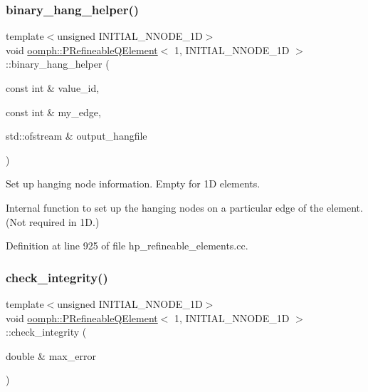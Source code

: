 \subsubsection{\texorpdfstring{binary\+\_\+hang\+\_\+helper()}{binary\_hang\_helper()}}
{\footnotesize\ttfamily template$<$unsigned I\+N\+I\+T\+I\+A\+L\+\_\+\+N\+N\+O\+D\+E\+\_\+1D$>$ \\
void \hyperlink{classoomph_1_1PRefineableQElement}{oomph\+::\+P\+Refineable\+Q\+Element}$<$ 1, I\+N\+I\+T\+I\+A\+L\+\_\+\+N\+N\+O\+D\+E\+\_\+1D $>$\+::binary\+\_\+hang\+\_\+helper (\begin{DoxyParamCaption}\item[{const int \&}]{value\+\_\+id,  }\item[{const int \&}]{my\+\_\+edge,  }\item[{std\+::ofstream \&}]{output\+\_\+hangfile }\end{DoxyParamCaption})\hspace{0.3cm}{\ttfamily [protected]}}



Set up hanging node information. Empty for 1D elements. 

Internal function to set up the hanging nodes on a particular edge of the element. (Not required in 1D.) 

Definition at line 925 of file hp\+\_\+refineable\+\_\+elements.\+cc.

\mbox{\label{classoomph_1_1PRefineableQElement_3_011_00_01INITIAL__NNODE__1D_01_4_a639085069bcf2e9415c28385880bd2bd}} 
\subsubsection{\texorpdfstring{check\+\_\+integrity()}{check\_integrity()}}
{\footnotesize\ttfamily template$<$unsigned I\+N\+I\+T\+I\+A\+L\+\_\+\+N\+N\+O\+D\+E\+\_\+1D$>$ \\
void \hyperlink{classoomph_1_1PRefineableQElement}{oomph\+::\+P\+Refineable\+Q\+Element}$<$ 1, I\+N\+I\+T\+I\+A\+L\+\_\+\+N\+N\+O\+D\+E\+\_\+1D $>$\+::check\+\_\+integrity (\begin{DoxyParamCaption}\item[{double \&}]{max\+\_\+error }\end{DoxyParamCaption})\hspace{0.3cm}{\ttfamily [virtual]}}



